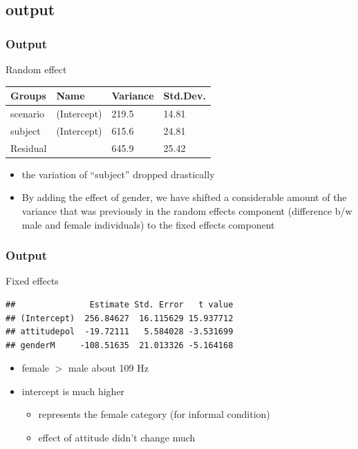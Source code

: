 \documentclass[10p]{beamer}\usepackage[]{graphicx}\usepackage[]{color}
\makeatletter
\newenvironment{kframe}{%
 \def\at@end@of@kframe{}%
 \ifinner\ifhmode%
  \def\at@end@of@kframe{\end{minipage}}%
  \begin{minipage}{\columnwidth}%
 \fi\fi%
 \def\FrameCommand##1{\hskip\@totalleftmargin \hskip-\fboxsep
 \colorbox{shadecolor}{##1}\hskip-\fboxsep
     \hskip-\linewidth \hskip-\@totalleftmargin \hskip\columnwidth}%
 \MakeFramed {\advance\hsize-\width
   \@totalleftmargin\z@ \linewidth\hsize
   \@setminipage}}%
 {\par\unskip\endMakeFramed%
 \at@end@of@kframe}
\newenvironment{knitrout}{}{} %
\makeatother
\begin{document}
\subsection{output}
\begin{frame}
\frametitle{Output}
Random effect

\vspace{9pt}
\begin{tabular}{llll}
\toprule
Groups & Name & Variance & Std.Dev. \\
\midrule
scenario & (Intercept) & 219.5 & 14.81 \\
subject & (Intercept) & 615.6 & 24.81 \\
Residual & & 645.9 & 25.42 \\
\bottomrule
\end{tabular}
\begin{itemize}
\item the variation of ``subject'' dropped drastically
\item By adding the effect of gender, we have shifted a considerable amount of the variance that was previously in the random effects component (difference b/w male and female individuals) to the fixed effects component
\end{itemize}
\end{frame}

\begin{frame}[fragile]
\frametitle{Output}
Fixed effects
\begin{knitrout}\scriptsize
{}\color{fgcolor}\begin{kframe}
\begin{verbatim}
##               Estimate Std. Error   t value
## (Intercept)  256.84627  16.115629 15.937712
## attitudepol  -19.72111   5.584028 -3.531699
## genderM     -108.51635  21.013326 -5.164168
\end{verbatim}
\end{kframe}
\end{knitrout}
\begin{itemize}
\item female $>$ male about 109 Hz
\item intercept is much higher
	\begin{itemize}
	\item represents the female category (for informal condition)
\item effect of attitude didn't change much
	\end{itemize}
\end{itemize}
\end{frame}
\end{document}

